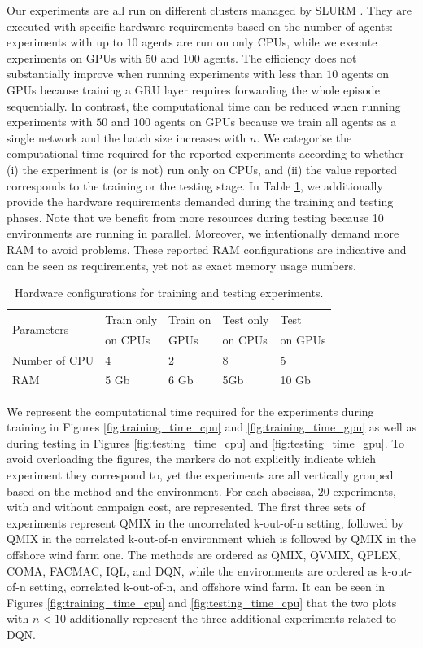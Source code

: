 Our experiments are all run on different clusters managed by SLURM \citep{yoo2003slurm}.
They are executed with specific hardware requirements based on the number of agents: experiments with up to $10$ agents are run on only CPUs, while we execute experiments on GPUs with $50$ and $100$ agents.
The efficiency does not substantially improve when running experiments with less than $10$ agents on GPUs because training a GRU layer requires forwarding the whole episode sequentially.
In contrast, the computational time can be reduced when running experiments with $50$ and $100$ agents on GPUs because we train all agents as a single network and the batch size increases with $n$. 
We categorise the computational time required for the reported experiments according to whether (i) the experiment is (or is not) run only on CPUs, and (ii) the value reported corresponds to the training or the testing stage.
In Table \ref{tab:slurmdetails}, we additionally provide the hardware requirements demanded during the training and testing phases.
Note that we benefit from more resources during testing because 10 environments are running in parallel.
Moreover, we intentionally demand more RAM to avoid problems.
These reported RAM configurations are indicative and can be seen as requirements, yet not as exact memory usage numbers.

\begin{table}
  \caption{Hardware configurations for training and testing experiments.}
  \label{tab:slurmdetails}
  \centering
  \setlength\tabcolsep{4.5pt}
  \begin{tabular}{lllll}
    \toprule
    \multirow{2}{*}{Parameters} & Train only & Train on & Test only  & Test\\ 
     & on CPUs & GPUs & on CPUs &  on GPUs \\  
    \midrule
    Number of CPU & 4  & 2 & 8 & 5 \\ 
    RAM           & 5 Gb & 6 Gb & 5Gb & 10 Gb \\ 
    \bottomrule
  \end{tabular}
\end{table}

We represent the computational time required for the experiments during training in Figures \ref{fig:training_time_cpu} and \ref{fig:training_time_gpu} as well as during testing in Figures \ref{fig:testing_time_cpu} and \ref{fig:testing_time_gpu}.
To avoid overloading the figures, the markers do not explicitly indicate which experiment they correspond to, yet the experiments are all vertically grouped based on the method and the environment.
For each abscissa, $20$ experiments, with and without campaign cost, are represented.
The first three sets of experiments represent QMIX in the uncorrelated k-out-of-n setting, followed by QMIX in the correlated k-out-of-n environment which is followed by QMIX in the offshore wind farm one.
The methods are ordered as QMIX, QVMIX, QPLEX, COMA, FACMAC, IQL, and DQN, while the environments are ordered as k-out-of-n setting, correlated k-out-of-n, and offshore wind farm.
It can be seen in Figures \ref{fig:training_time_cpu} and \ref{fig:testing_time_cpu} that the two plots with $n<10$ additionally represent the three additional experiments related to DQN.

